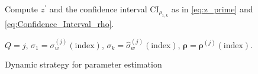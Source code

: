 \begin{algorithm}[!ht]
{{    Compute $z^\prime$ and the confidence interval $\text{CI}_{\rho_{1,k}}$ as in \eqref{eq:z_prime} and \eqref{eq:Confidence_Interval_rho}.
    

    
    {
    }
    }
    
    
    }    
    
    $Q=j$, $\sigma_1 = \sigma_w^{(j)}(\text{index})$, $\sigma_k = \widehat\sigma_w^{(j)}(\text{index})$, $\boldsymbol{\rho} = \boldsymbol{\rho}^{(j)}(\text{index})$.
\caption{Dynamic strategy for parameter estimation}\label{algo:Parameter_Estimation}
\end{algorithm}







%

